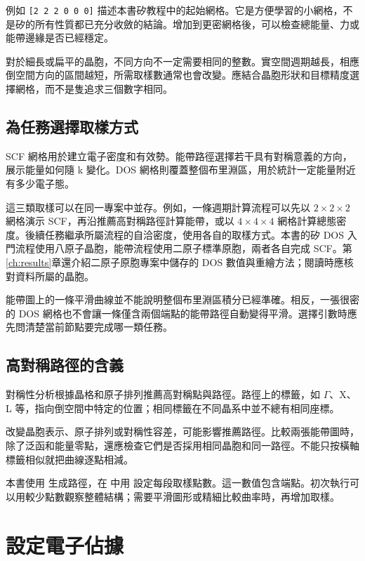 例如 \mbox{\texttt{[2 2 2 0 0 0]}} 描述本書矽教程中的起始網格。它是方便學習的小網格，不是矽的所有性質都已充分收斂的結論。增加到更密網格後，可以檢查總能量、力或能帶邊緣是否已經穩定。

對於細長或扁平的晶胞，不同方向不一定需要相同的整數。實空間週期越長，相應倒空間方向的區間越短，所需取樣數通常也會改變。應結合晶胞形狀和目標精度選擇網格，而不是隻追求三個數字相同。

\subsection{為任務選擇取樣方式}

SCF 網格用於建立電子密度和有效勢。能帶路徑選擇若干具有對稱意義的方向，展示能量如何隨 k 變化。DOS 網格則覆蓋整個布里淵區，用於統計一定能量附近有多少電子態。



這三類取樣可以在同一專案中並存。例如，一條週期計算流程可以先以 $2\times2\times2$ 網格演示 SCF，再沿推薦高對稱路徑計算能帶，或以 $4\times4\times4$ 網格計算總態密度。後續任務繼承所屬流程的自洽密度，使用各自的取樣方式。本書的矽 DOS 入門流程使用八原子晶胞，能帶流程使用二原子標準原胞，兩者各自完成 SCF。第\ref{ch:results}章還介紹二原子原胞專案中儲存的 DOS 數值與重繪方法；閱讀時應核對資料所屬的晶胞。

能帶圖上的一條平滑曲線並不能說明整個布里淵區積分已經準確。相反，一張很密的 DOS 網格也不會讓一條僅含兩個端點的能帶路徑自動變得平滑。選擇引數時應先問清楚當前節點要完成哪一類任務。

\subsection{高對稱路徑的含義}

對稱性分析根據晶格和原子排列推薦高對稱點與路徑。路徑上的標籤，如 $\Gamma$、X、L 等，指向倒空間中特定的位置；相同標籤在不同晶系中並不總有相同座標。

改變晶胞表示、原子排列或對稱性容差，可能影響推薦路徑。比較兩張能帶圖時，除了泛函和能量零點，還應檢查它們是否採用相同晶胞和同一路徑。不能只按橫軸標籤相似就把曲線逐點相減。

本書使用  生成路徑，在  中用 \mbox{} 設定每段取樣點數。這一數值包含端點。初次執行可以用較少點數觀察整體結構；需要平滑圖形或精細比較曲率時，再增加取樣。

\section{設定電子佔據}

